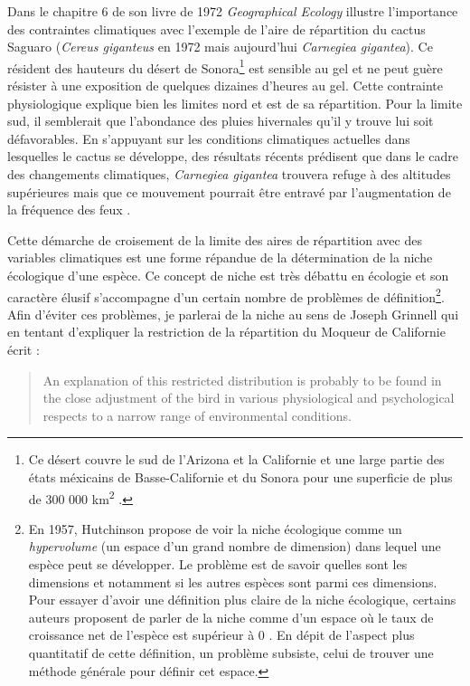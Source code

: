 Dans le chapitre 6 de son livre de 1972 \emph{Geographical Ecology}
illustre l'importance des contraintes climatiques avec l'exemple de
l'aire de répartition du cactus Saguaro (\emph{Cereus giganteus} en 1972
mais aujourd'hui \emph{Carnegiea gigantea}). Ce résident des hauteurs du
désert de Sonora\footnote{Ce désert couvre le sud de l'Arizona et la
  Californie et une large partie des états méxicains de Basse-Californie
  et du Sonora pour une superficie de plus de 300 000
  km\textsuperscript{2} .} est sensible au gel et ne peut guère résister
à une exposition de quelques dizaines d'heures au gel. Cette contrainte
physiologique explique bien les limites nord et est de sa répartition.
Pour la limite sud, il semblerait que l'abondance des pluies hivernales
qu'il y trouve lui soit défavorables. En s'appuyant sur les conditions
climatiques actuelles dans lesquelles le cactus se développe, des
résultats récents prédisent que dans le cadre des changements
climatiques, \emph{Carnegiea gigantea} trouvera refuge à des altitudes
supérieures mais que ce mouvement pourrait être entravé par
l'augmentation de la fréquence des feux \citep{Springer2015}.

Cette démarche de croisement de la limite des aires de répartition avec
des variables climatiques est une forme répandue de la détermination de
la niche écologique d'une espèce. Ce concept de niche est très débattu
en écologie et son caractère élusif s'accompagne d'un certain nombre de
problèmes de définition\footnote{En 1957, Hutchinson propose de voir la
  niche écologique comme un \emph{hypervolume} (un espace d'un grand
  nombre de dimension) dans lequel une espèce peut se développer. Le
  problème est de savoir quelles sont les dimensions et notamment si les
  autres espèces sont parmi ces dimensions. Pour essayer d'avoir une
  définition plus claire de la niche écologique, certains auteurs
  proposent de parler de la niche comme d'un espace où le taux de
  croissance net de l'espèce est supérieur à 0 \citep{Chase2003}. En
  dépit de l'aspect plus quantitatif de cette définition, un problème
  subsiste, celui de trouver une méthode générale pour définir cet
  espace.}. Afin d'éviter ces problèmes, je parlerai de la niche au sens
de Joseph Grinnell qui en tentant d'expliquer la restriction de la
répartition du Moqueur de Californie écrit :

\begin{quote}
An explanation of this restricted distribution is probably to be found
in the close adjustment of the bird in various physiological and
psychological respects to a narrow range of environmental conditions.
\end{quote}

